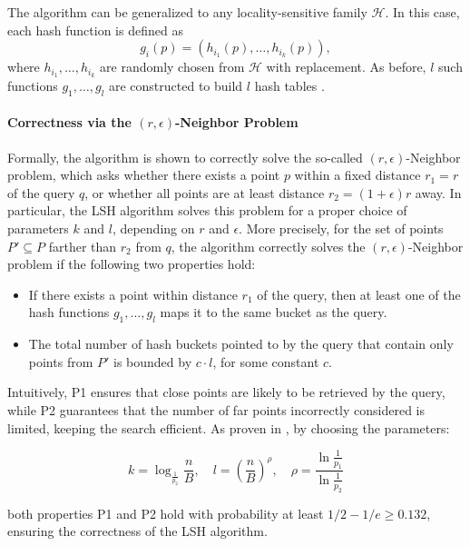 The algorithm can be generalized to any locality-sensitive family $\mathcal{H}$. In this case, each hash function is defined as
\[
g_i(p) = (h_{i_1}(p), \dots, h_{i_k}(p)),
\]  
where $h_{i_1}, \dots, h_{i_k}$ are randomly chosen from $\mathcal{H}$ with replacement. As before, $l$ such functions $g_1, \dots, g_l$ are constructed to build $l$ hash tables \cite{Gionis-Indyk-Motwani-1999}.

\paragraph{Correctness via the $(r, \epsilon)$-Neighbor Problem}

Formally, the algorithm is shown \cite{Gionis-Indyk-Motwani-1999} to correctly solve the so-called $(r, \epsilon)$-Neighbor problem, which asks whether there exists a point $p$ within a fixed distance $r_1 = r$ of the query $q$, or whether all points are at least distance $r_2 = (1 + \epsilon)r$ away. In particular, the LSH algorithm solves this problem for a proper choice of parameters $k$ and $l$, depending on $r$ and $\epsilon$. More precisely, for the set of points $P' \subseteq P$ farther than $r_2$ from $q$, the algorithm correctly solves the $(r, \epsilon)$-Neighbor problem if the following two properties hold:

\begin{itemize}
    \item[\textbf{P1}] If there exists a point within distance $r_1$ of the query, then at least one of the hash functions $g_1, \dots, g_l$ maps it to the same bucket as the query.
    \item[\textbf{P2}] The total number of hash buckets pointed to by the query that contain only points from $P'$ is bounded by $c \cdot l$, for some constant $c$.
\end{itemize}

Intuitively, P1 ensures that close points are likely to be retrieved by the query, while P2 guarantees that the number of far points incorrectly considered is limited, keeping the search efficient. As proven in \cite{Gionis-Indyk-Motwani-1999}, by choosing the parameters:

\[
k = \log_{\frac{1}{p_2}} \frac{n}{B}, \quad 
l = \left( \frac{n}{B} \right)^\rho, \quad 
\rho = \frac{\ln \frac{1}{p_1}}{\ln \frac{1}{p_2}}
\]

both properties P1 and P2 hold with probability at least $1/2 - 1/e \ge 0.132$, ensuring the correctness of the LSH algorithm.\newline

